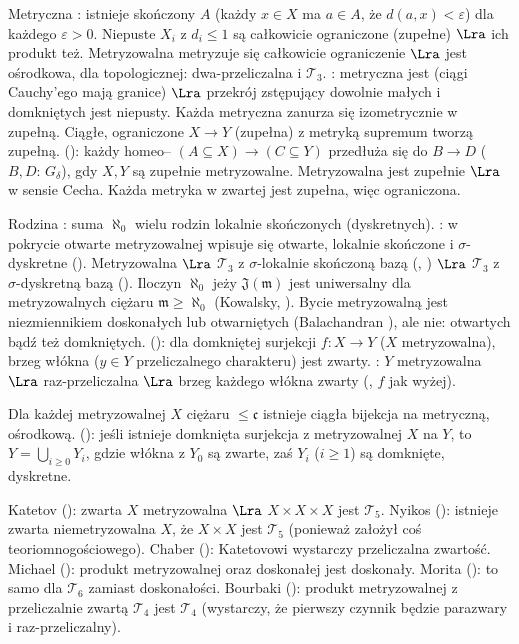 Metryczna  : istnieje skończony  $A$ (każdy $x \in X$ ma $a \in A$, że $d(a,x) < \varepsilon$) dla każdego $\varepsilon > 0$.
Niepuste $X_i$ z $d_i \le 1$ są całkowicie ograniczone (zupełne) $\Lra$ ich produkt też.
Metryzowalna metryzuje się całkowicie ograniczenie $\Lra$ jest ośrodkowa, dla topologicznej: dwa-przeliczalna i $\mathcal T_3$.
: metryczna jest  (ciągi Cauchy'ego mają granice) $\Lra$ przekrój zstępujący dowolnie małych i domkniętych jest niepusty.
Każda metryczna zanurza się izometrycznie w zupełną.
Ciągłe, ograniczone $X \to Y$ (zupełna) z metryką supremum tworzą zupełną.
 (): każdy homeo-- $(A \subseteq X) \to (C \subseteq Y)$ przedłuża się do $B \to D$ ($B, D$: $G_\delta$), gdy $X, Y$ są zupełnie metryzowalne.
Metryzowalna jest zupełnie $\Lra$ w sensie Cecha.
Każda metryka w zwartej jest zupełna, więc ograniczona.

Rodzina  : suma $\aleph_0$ wielu rodzin lokalnie skończonych (dyskretnych).
: w pokrycie otwarte metryzowalnej wpisuje się otwarte, lokalnie skończone i $\sigma$-dyskretne ().
Metryzowalna $\Lra$ $\mathcal T_3$ z $\sigma$-lokalnie skończoną bazą (, ) $\Lra$ $\mathcal T_3$ z $\sigma$-dyskretną bazą ().
Iloczyn $\aleph_0$ jeży $\mathfrak J(\mathfrak m)$ jest uniwersalny dla metryzowalnych ciężaru $\mathfrak m \ge \aleph_0$ (Kowalsky, ).
Bycie metryzowalną jest niezmiennikiem doskonałych lub otwarniętych (Balachandran ), ale nie: otwartych bądź też domkniętych.
 (): dla domkniętej surjekcji $f \colon X \to Y$ ($X$ metryzowalna), brzeg włókna ($y \in Y$ przeliczalnego charakteru) jest zwarty.
: $Y$ metryzowalna $\Lra$ raz-przeliczalna $\Lra$ brzeg każdego włókna zwarty (, $f$ jak wyżej).

Dla każdej metryzowalnej $X$ ciężaru $\le \mathfrak c$ istnieje ciągła bijekcja na metryczną, ośrodkową.
 (): jeśli istnieje domknięta surjekcja z metryzowalnej $X$ na $Y$, to $Y = \bigcup_{i \ge 0} Y_i$, gdzie włókna z $Y_0$ są zwarte, zaś $Y_i$ ($i \ge 1$) są domknięte, dyskretne.

Katetov (): zwarta $X$ metryzowalna $\Lra$ $X \times X \times X$ jest $\mathcal T_5$.
Nyikos (): istnieje zwarta niemetryzowalna $X$, że $X \times X$ jest $\mathcal T_5$ (ponieważ założył coś teoriomnogościowego).
Chaber (): Katetovowi wystarczy przeliczalna zwartość.
Michael ():  produkt metryzowalnej oraz doskonałej jest doskonały.
Morita (): to samo dla $\mathcal T_6$ zamiast doskonałości.
Bourbaki (): produkt metryzowalnej z przeliczalnie zwartą $\mathcal T_4$ jest $\mathcal T_4$ (wystarczy, że pierwszy czynnik będzie parazwary i raz-przeliczalny).